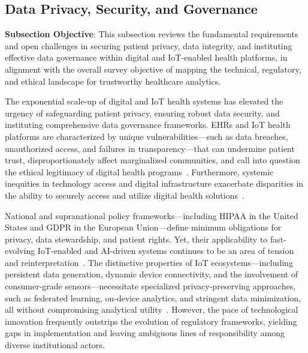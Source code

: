\documentclass[sigconf]{acmart}
\begin{document}
\subsection{Data Privacy, Security, and Governance}

\textbf{Subsection Objective}: This subsection reviews the fundamental requirements and open challenges in securing patient privacy, data integrity, and instituting effective data governance within digital and IoT-enabled health platforms, in alignment with the overall survey objective of mapping the technical, regulatory, and ethical landscape for trustworthy healthcare analytics.

The exponential scale-up of digital and IoT health systems has elevated the urgency of safeguarding patient privacy, ensuring robust data security, and instituting comprehensive data governance frameworks. EHRs and IoT health platforms are characterized by unique vulnerabilities—such as data breaches, unauthorized access, and failures in transparency—that can undermine patient trust, disproportionately affect marginalized communities, and call into question the ethical legitimacy of digital health programs~\cite{ref2,ref6,ref7,ref8,ref9,ref10,ref24,ref25,ref28,ref30,ref46,ref50,ref51,ref61,ref63,ref64,ref70,ref82,ref83,ref84,ref106}. Furthermore, systemic inequities in technology access and digital infrastructure exacerbate disparities in the ability to securely access and utilize digital health solutions~\cite{ref84,ref106}.

National and supranational policy frameworks—including HIPAA in the United States and GDPR in the European Union—define minimum obligations for privacy, data stewardship, and patient rights. Yet, their applicability to fast-evolving IoT-enabled and AI-driven systems continues to be an area of tension and reinterpretation~\cite{ref2,ref4,ref5,ref6,ref7,ref8,ref9,ref10,ref24,ref25,ref28,ref30,ref31,ref33,ref34,ref35,ref36,ref41,ref43,ref46,ref50,ref54,ref51,ref61,ref62,ref63,ref64,ref65,ref70,ref71,ref72,ref75,ref76,ref77,ref78,ref79,ref82,ref83,ref84,ref90}. The distinctive properties of IoT ecosystems—including persistent data generation, dynamic device connectivity, and the involvement of consumer-grade sensors—necessitate specialized privacy-preserving approaches, such as federated learning, on-device analytics, and stringent data minimization, all without compromising analytical utility~\cite{ref83,ref84,ref90}. However, the pace of technological innovation frequently outstrips the evolution of regulatory frameworks, yielding gaps in implementation and leaving ambiguous lines of responsibility among diverse institutional actors.
\end{document}
